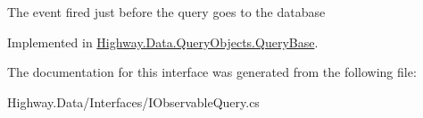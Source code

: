 The event fired just before the query goes to the database 



Implemented in \hyperlink{class_highway_1_1_data_1_1_query_objects_1_1_query_base_a0f4a7c6fcd8e32c461633855ed00f824}{Highway.\-Data.\-Query\-Objects.\-Query\-Base}.



The documentation for this interface was generated from the following file\-:\begin{DoxyCompactItemize}
\item 
Highway.\-Data/\-Interfaces/I\-Observable\-Query.\-cs\end{DoxyCompactItemize}
